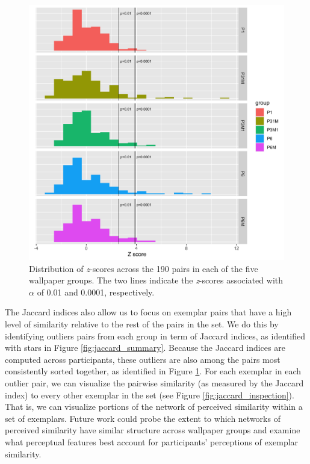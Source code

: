 \documentclass[11pt, twoside]{article}
\begin{document}
\begin{figure}[H]
	\centering
	\includegraphics[width=.9\linewidth]{./figures/jaccard_permutation.png}
	\caption{Distribution of \textit{z}-scores across the 190 pairs in each of the five wallpaper groups. The two lines indicate the \textit{z}-scores associated with $\alpha$ of 0.01 and 0.0001, respectively.}
	\label{fig:jaccard_permutation}
\end{figure}

The Jaccard indices also allow us to focus on exemplar pairs that have a high level of similarity relative to the rest of the pairs in the set. We do this by identifying outliers pairs from each group in term of Jaccard indices, as identified with stars in Figure \ref{fig:jaccard_summary}. Because the Jaccard indices are computed across participants, these outliers are also among the pairs most consistently sorted together, as identified in Figure \ref{fig:jaccard_permutation}. For each exemplar in each outlier pair, we can visualize the pairwise similarity (as measured by the Jaccard index) to every other exemplar in the set (see Figure \ref{fig:jaccard_inspection}). That is, we can visualize portions of the network of perceived similarity within a set of exemplars. Future work could probe the extent to which networks of perceived similarity have similar structure across wallpaper groups and examine what perceptual features best account for participants' perceptions of exemplar similarity.
\end{document}
